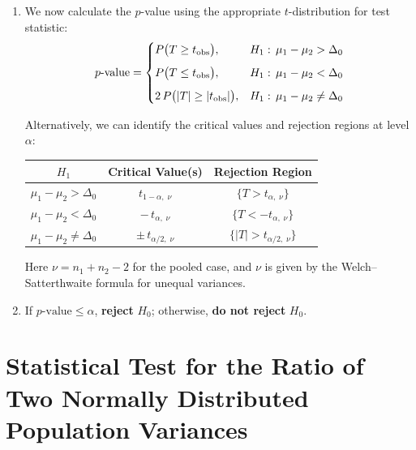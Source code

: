 \documentclass[twoside]{book}
\begin{document}
\begin{enumerate}
\begin{description}[leftmargin=1cm]
		Under $H_0$, $T$ {approximately} follows a \(t\)-distribution with $\nu$ degrees of freedom (\textbf{Welch approximation}) where
		$$\nu \approx
		\dfrac{\left( \dfrac{S_1^2}{n_1}+\dfrac{S_2^2}{n_2}\right)^{2}}
		{\dfrac{(S_1^2/n_1)^2}{n_1-1} \;+\;\dfrac{(S_2^2/n_2)^2}{n_2-1}}$$
	\end{description}

	\item We now calculate the \(p\)-value using the appropriate \(t\)-distribution for test statistic:
	\[
	p\text{-value} =
	\begin{cases}
	P\bigl(T \ge t_{\rm obs}\bigr), & H_1:\,\mu_1-\mu_2 > \Delta_0\\[6pt]
	P\bigl(T \le t_{\rm obs}\bigr), & H_1:\,\mu_1-\mu_2 < \Delta_0\\[6pt]
	2\,P\bigl(|T|\ge |t_{\rm obs}|\bigr), & H_1:\,\mu_1-\mu_2 \neq \Delta_0
	\end{cases}
	\]

	Alternatively, we can identify the critical values and rejection regions at level \(\alpha\):

	\begin{table}[H]
		\centering
		\begin{tabular}{@{}c|c|c@{}}
			\toprule
			\textbf{$H_1$} & \textbf{Critical Value(s)} & \textbf{Rejection Region} \\
			\midrule
			\(\mu_1-\mu_2>\Delta_0\) &
			\(t_{1-\alpha,\;\nu}\) &
			\(\{T > t_{\alpha,\;\nu}\}\) \\[6pt]
			\(\mu_1-\mu_2<\Delta_0\) &
			\(-\,t_{\alpha,\;\nu}\) &
			\(\{T < -t_{\alpha,\;\nu}\}\) \\[6pt]
			\(\mu_1-\mu_2\neq\Delta_0\) &
			\(\pm\,t_{\alpha/2,\;\nu}\) &
			\(\{|T| > t_{\alpha/2,\;\nu}\}\) \\
			\bottomrule
		\end{tabular}
	\end{table}

	Here \(\nu = n_1+n_2-2\) for the pooled case, and \(\nu\) is given by the Welch–Satterthwaite formula for unequal variances.

	\item If \(p\text{-value}\le\alpha\), \textbf{reject} \(H_0\); otherwise, \textbf{do not reject} \(H_0\).
\end{enumerate}


\section{Statistical Test for the Ratio of Two Normally Distributed Population Variances}
\end{document}
